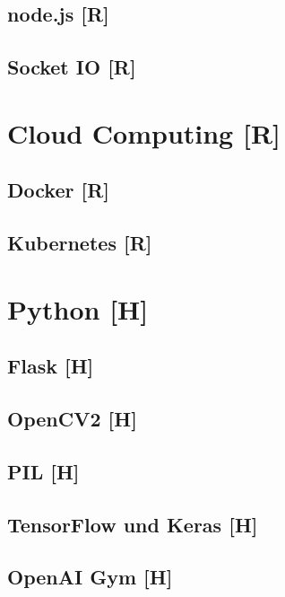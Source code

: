 \subsection {node.js [R]}
\subsection{Socket IO [R]}

\section{Cloud Computing [R]}
\subsection{Docker [R]}
\subsection{Kubernetes [R]}


\section{Python [H]}

\subsection{Flask [H]}

\subsection{OpenCV2 [H]}

\subsection{PIL [H]}

\subsection{TensorFlow und Keras [H]}

\subsection{OpenAI Gym [H]}
